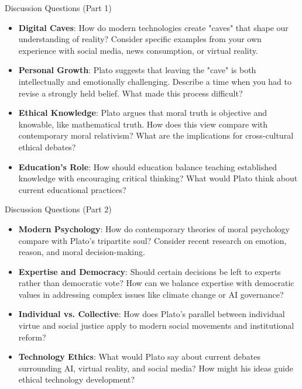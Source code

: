 \documentclass[aspectratio=169]{beamer}
\begin{document}
\begin{frame}{Discussion Questions (Part 1)}
\begin{itemize}
\item \textbf{Digital Caves}: How do modern technologies create "caves" that shape our understanding of reality? Consider specific examples from your own experience with social media, news consumption, or virtual reality.

\item \textbf{Personal Growth}: Plato suggests that leaving the "cave" is both intellectually and emotionally challenging. Describe a time when you had to revise a strongly held belief. What made this process difficult?

\item \textbf{Ethical Knowledge}: Plato argues that moral truth is objective and knowable, like mathematical truth. How does this view compare with contemporary moral relativism? What are the implications for cross-cultural ethical debates?

\item \textbf{Education's Role}: How should education balance teaching established knowledge with encouraging critical thinking? What would Plato think about current educational practices?
\end{itemize}
\end{frame}

\begin{frame}{Discussion Questions (Part 2)}
\begin{itemize}
\item \textbf{Modern Psychology}: How do contemporary theories of moral psychology compare with Plato's tripartite soul? Consider recent research on emotion, reason, and moral decision-making.

\item \textbf{Expertise and Democracy}: Should certain decisions be left to experts rather than democratic vote? How can we balance expertise with democratic values in addressing complex issues like climate change or AI governance?

\item \textbf{Individual vs. Collective}: How does Plato's parallel between individual virtue and social justice apply to modern social movements and institutional reform?

\item \textbf{Technology Ethics}: What would Plato say about current debates surrounding AI, virtual reality, and social media? How might his ideas guide ethical technology development?
\end{itemize}
\end{frame}
\end{document}
